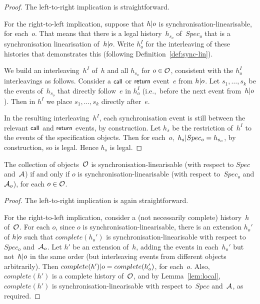 \begin{proof}
The left-to-right implication is straightforward.  

For the right-to-left implication, suppose that $h {\mid} o$ is
synchronisation-linearisable, for each~$o$.  That means that there is a legal
history~$h_{s_o}$ of~$Spec_o$ that is a synchronisation linearisation of~$h
{\mid} o$.  Write $h^I_o$ for the interleaving of these histories that
demonstrates this (following Definition~\ref{def:sync-lin}).

We build an interleaving~$h^I$ of~$h$ and all $h_{s_o}$ for $o \in \mathcal{O}$,
consistent with the $h^I_o$ interleavings as follows.
Consider a $\mbox{\sf{\small call}}$ or $\mbox{\sf{\small return}}$ event~$e$ from $h {\mid} o$.  Let
$s_1,\ldots,s_k$ be the events of~$h_{s_o}$ that directly follow~$e$ in
$h^I_o$ (i.e.,~before the next event from~$h {\mid} o$).  Then in $h^I$ we
place $s_1,\ldots,s_k$ directly after~$e$.


In the resulting interleaving~$h^I$, each synchronisation event is still
between the relevant $\mbox{\sf{\small call}}$ and $\mbox{\sf{\small return}}$ events, by construction.  Let $h_s$
be the restriction of~$h^I$ to the events of the specification
objects.  Then for each~$o$,\, $h_s {\mid} Spec_o = h_{s_o}$, by
construction, so is legal.  Hence $h_s$ is legal.
\end{proof}

\begin{prop}
The collection of objects~$\mathcal{O}$ is synchronisation-linearisable (with respect
to $Spec$ and~$\mathcal{A}$) if and only if $o$ is synchronisation-linearisable (with
respect to~$Spec_o$ and $\mathcal{A}_o$), for each $o \in \mathcal{O}$.
\end{prop}
%
\begin{proof}
The left-to-right implication is again straightforward.  

For the right-to-left implication, consider a (not necessarily complete)
history~$h$ of~$\mathcal{O}$.  For each $o$, since $o$ is synchronisation-linearisable,
there is an extension $h_o'$ of $h {\mid} o$ such that $complete(h_o')$ is
synchronisation-linearisable with respect to $Spec_o$ and~$\mathcal{A}_o$.
%
Let $h'$ be an extension of~$h$, adding the events in each~$h_o'$ but not~$h
{\mid} o$ in the same order (but interleaving events from different objects
arbitrarily).  Then $complete(h') {\mid} o = complete(h_o')$, for each~$o$.
%
Also, $complete(h')$ is a complete history of~$\mathcal{O}$, and by
Lemma~\ref{lem:local}, $complete(h')$ is synchronisation-linearisable with
respect to~$Spec$ and~$\mathcal{A}$, as required.
\end{proof}

